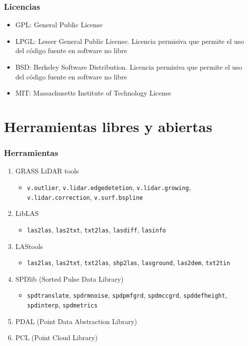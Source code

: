 \begin{frame}
  \frametitle{Licencias}
  \begin{itemize}
    \item \alert{GPL}: General Public License
    \item \alert{LPGL}: Lesser General Public License. Licencia permisiva que permite el uso del código fuente en software no libre
    \item \alert{BSD}: Berkeley Software Distribution. Licencia permisiva que permite el uso del código fuente en software no libre
    \item \alert{MIT}: Massachusetts Institute of Technology License
  \end{itemize}
\end{frame}
\section{Herramientas libres y abiertas}
\begin{frame}
  \frametitle{Herramientas}
  \begin{enumerate}
    \item GRASS LiDAR tools 
    	\begin{itemize}
        \item \texttt{v.outlier}, \texttt{v.lidar.edgedetetion}, \texttt{v.lidar.growing}, \texttt{v.lidar.correction}, \texttt{v.surf.bspline}
    	\end{itemize}
    \item LibLAS
    	\begin{itemize}
        \item \texttt{las2las}, \texttt{las2txt}, \texttt{txt2las}, \texttt{lasdiff}, \texttt{lasinfo} 
    	\end{itemize}
    \item LAStools
    	\begin{itemize}
        \item \texttt{las2las}, \texttt{las2txt}, \texttt{txt2las}, \texttt{shp2las}, \texttt{lasground}, \texttt{las2dem}, \texttt{txt2tin}
    	\end{itemize}
    \item SPDlib (Sorted Pulse Data Library)
      \begin{itemize}
        \item \texttt{spdtranslate}, \texttt{spdrmnoise}, \texttt{spdpmfgrd}, \texttt{spdmccgrd}, \texttt{spddefheight}, \texttt{spdinterp}, \texttt{spdmetrics}
      \end{itemize}
    \item PDAL (Point Data Abstraction Library)
    \item PCL (Point Cloud Library)
  \end{enumerate}
\end{frame}
